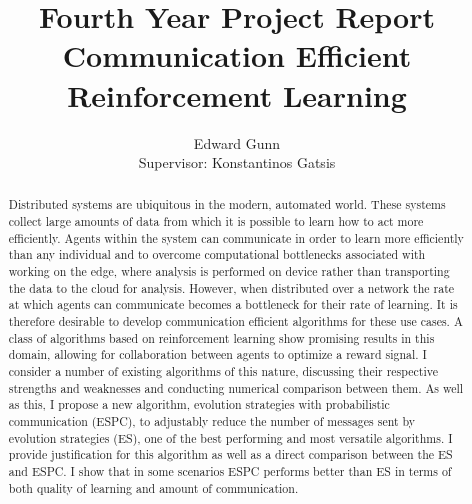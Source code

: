 \documentclass[letterpaper,11pt]{report}
\begin{document}
\title{Fourth Year Project Report \\ \textbf{Communication Efficient Reinforcement Learning}}
\author{Edward Gunn \\ Supervisor: Konstantinos Gatsis}
\maketitle 

\begin{abstract}
    Distributed systems are ubiquitous in the modern, automated world.
    These systems collect large amounts of data from which it is possible to learn how to act more efficiently.
    Agents within the system can communicate in order to learn more efficiently than any individual and to overcome computational bottlenecks associated with working on the edge, where analysis is performed on device rather than transporting the data to the cloud for analysis.
    However, when distributed over a network the rate at which agents can communicate becomes a bottleneck for their rate of learning.
    It is therefore desirable to develop communication efficient algorithms for these use cases. A class of algorithms based on reinforcement learning show promising results in this domain, allowing for collaboration between agents to optimize a reward signal. I consider a number of existing algorithms of this nature, discussing their respective strengths and weaknesses and conducting numerical comparison between them. As well as this, I propose a new algorithm, evolution strategies with probabilistic communication (ESPC), to adjustably reduce the number of messages sent by evolution strategies (ES), one of the best performing and most versatile algorithms. I provide justification for this algorithm as well as a direct comparison between the ES and ESPC. I show that in some scenarios ESPC performs better than ES in terms of both quality of learning and amount of communication.
\end{abstract}

\tableofcontents















% 
\end{document}
